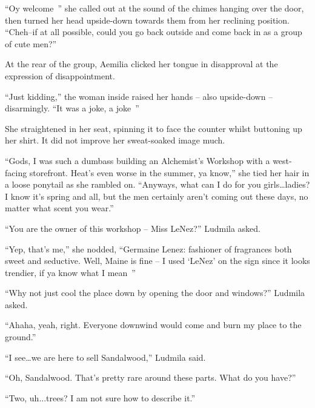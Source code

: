 

“Oy welcome~” she called out at the sound of the chimes hanging over the door, then turned her head upside-down towards them from her reclining position. “Cheh–if at all possible, could you go back outside and come back in as a group of cute men?”

 

At the rear of the group, Aemilia clicked her tongue in disapproval at the expression of disappointment.

 

“Just kidding,” the woman inside raised her hands – also upside-down – disarmingly. “It was a joke, a joke~”

 

She straightened in her seat, spinning it to face the counter whilst buttoning up her shirt. It did not improve her sweat-soaked image much.

 

“Gods, I was such a dumbass building an Alchemist’s Workshop with a west-facing storefront. Heat’s even worse in the summer, ya know,” she tied her hair in a loose ponytail as she rambled on. “Anyways, what can I do for you girls…ladies? I know it’s spring and all, but the men certainly aren’t coming out these days, no matter what scent you wear.”

 

“You are the owner of this workshop – Miss LeNez?” Ludmila asked.

 

“Yep, that’s me,” she nodded, “Germaine Lenez: fashioner of fragrances both sweet and seductive. Well, Maine is fine – I used ‘LeNez’ on the sign since it looks trendier, if ya know what I mean~”

 

“Why not just cool the place down by opening the door and windows?” Ludmila asked.

 

“Ahaha, yeah, right. Everyone downwind would come and burn my place to the ground.”

 

“I see…we are here to sell Sandalwood,” Ludmila said.

 

“Oh, Sandalwood. That’s pretty rare around these parts. What do you have?”

 

“Two, uh...trees? I am not sure how to describe it.”

 

